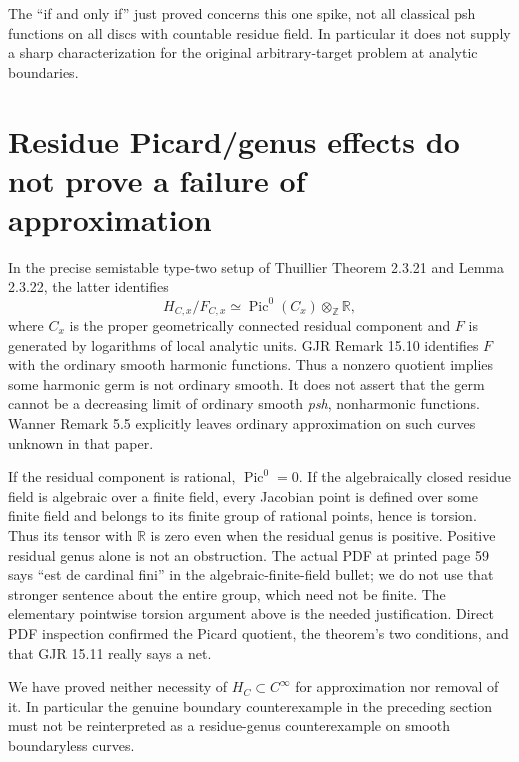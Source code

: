 \documentclass[11pt]{article}
\theoremstyle{remark}
\newcommand{\Pic}{\operatorname{Pic}}
\begin{document}
The ``if and only if'' just proved concerns this one spike, not all
classical psh functions on all discs with countable residue field. In
particular it does not supply a sharp characterization for the original
arbitrary-target problem at analytic boundaries.

\section{Residue Picard/genus effects do not prove a failure of approximation}
In the precise semistable type-two setup of Thuillier Theorem 2.3.21 and
Lemma 2.3.22, the latter identifies
\[
 H_{C,x}/F_{C,x}\simeq\Pic^0(C_x)\otimes_{\mathbb Z}\mathbb R,
\]
where $C_x$ is the proper geometrically connected residual component and
$F$ is generated by logarithms of local analytic units. GJR Remark 15.10
identifies $F$ with the ordinary smooth harmonic functions. Thus a nonzero
quotient implies some harmonic germ is not ordinary smooth. It does not
assert that the germ cannot be a decreasing limit of ordinary smooth
\emph{psh}, nonharmonic functions. Wanner Remark 5.5 explicitly leaves
ordinary approximation on such curves unknown in that paper.

If the residual component is rational, $\Pic^0=0$. If the algebraically
closed residue field is algebraic over a finite field, every Jacobian
point is defined over some finite field and belongs to its finite group
of rational points, hence is torsion. Thus its tensor with $\mathbb R$
is zero even when the residual genus is positive. Positive residual genus
alone is not an obstruction. The actual PDF at printed page 59 says
``est de cardinal fini'' in the algebraic-finite-field bullet; we do not
use that stronger sentence about the entire group, which need not be
finite. The elementary pointwise torsion argument above is the needed
justification. Direct PDF inspection confirmed the Picard quotient,
the theorem's two conditions, and that GJR 15.11 really says a net.

We have proved neither necessity of $H_C\subset C^\infty$ for
approximation nor removal of it. In particular the genuine boundary
counterexample in the preceding section must not be reinterpreted as
a residue-genus counterexample on smooth boundaryless curves.
\end{document}
